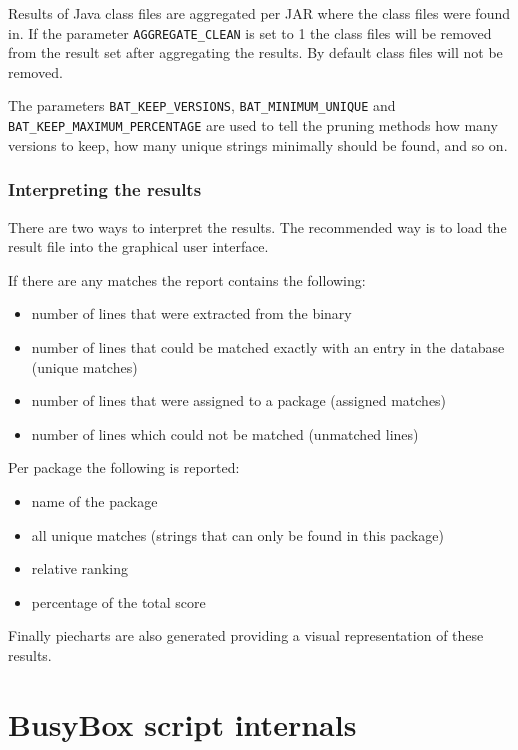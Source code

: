 \documentclass[10pt,a4paper]{article}
\begin{document}
Results of Java class files are aggregated per JAR where the class files were
found in. If the parameter \texttt{AGGREGATE\_CLEAN} is set to 1 the class
files will be removed from the result set after aggregating the results. By
default class files will not be removed.

The parameters \texttt{BAT\_KEEP\_VERSIONS}, \texttt{BAT\_MINIMUM\_UNIQUE} and
\texttt{BAT\_KEEP\_MAXIMUM\_PERCENTAGE} are used to tell the pruning methods
how many versions to keep, how many unique strings minimally should be found,
and so on.

\subsubsection{Interpreting the results}

There are two ways to interpret the results. The recommended way is to load the
result file into the graphical user interface.

If there are any matches the report contains the following:

\begin{itemize}
\item number of lines that were extracted from the binary
\item number of lines that could be matched exactly with an entry in the
database (unique matches)
\item number of lines that were assigned to a package (assigned matches)
\item number of lines which could not be matched (unmatched lines)
\end{itemize}

Per package the following is reported:

\begin{itemize}
\item name of the package
\item all unique matches (strings that can only be found in this package)
\item relative ranking
\item percentage of the total score
\end{itemize}

Finally piecharts are also generated providing a visual representation of these results.

\section{BusyBox script internals}
\end{document}
